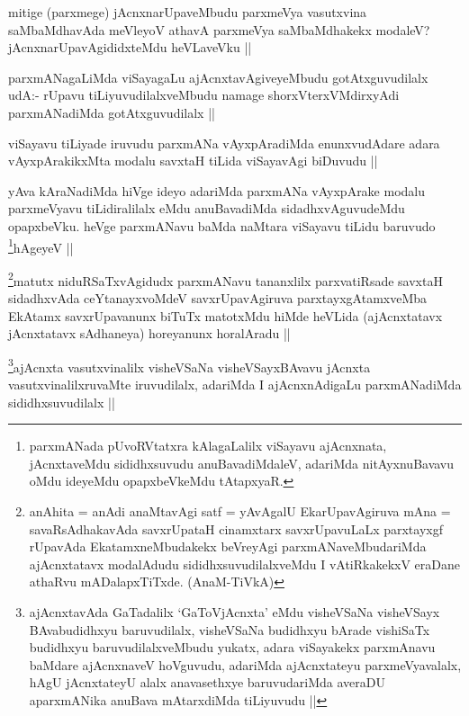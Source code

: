 \begin{artha}
mitige (parxmege) jAcnxnarUpaveMbudu parxmeVya vasutxvina saMbaMdhavAda meVleyoV athavA parxmeVya saMbaMdhakekx modaleV? jAcnxnarUpavAgididxteMdu heVLaveVku ||
\end{artha}

\begin{artha}
parxmANagaLiMda viSayagaLu ajAcnxtavAgiveyeMbudu gotAtxguvudilalx udA:- rUpavu tiLiyuvudilalxveMbudu namage shorxVterxVMdirxyAdi parxmANadiMda gotAtxguvudilalx ||
\end{artha}

\begin{artha}
viSayavu tiLiyade iruvudu parxmANa vAyxpAradiMda enunxvudAdare adara vAyxpArakikxMta modalu savxtaH tiLida viSayavAgi biDuvudu ||
\end{artha}

\begin{artha}
yAva kAraNadiMda hiVge ideyo adariMda parxmANa vAyxpArake modalu parxmeVyavu tiLidiralilalx eMdu anuBavadiMda sidadhxvAguvudeMdu opapxbeVku. heVge parxmANavu baMda naMtara viSayavu tiLidu baruvudo \footnote{parxmANada pUvoRVtatxra kAlagaLalilx viSayavu ajAcnxnata, jAcnxtaveMdu sididhxsuvudu anuBavadiMdaleV, adariMda nitAyxnuBavavu oMdu ideyeMdu opapxbeVkeMdu tAtapxyaR.}hAgeyeV ||
\end{artha}

\begin{artha}
\footnote{anAhita =  anAdi anaMtavAgi satf = yAvAgalU EkarUpavAgiruva mAna =  savaRsAdhakavAda savxrUpataH cinamxtarx savxrUpavuLaLx parxtayxgf rUpavAda EkatamxneMbudakekx beVreyAgi parxmANaveMbudariMda ajAcnxtatavx modalAdudu sididhxsuvudilalxveMdu I vAtiRkakekxV eraDane athaRvu mADalapxTiTxde. (AnaM-TiVkA)}matutx niduRSaTxvAgidudx parxmANavu tananxlilx parxvatiRsade savxtaH sidadhxvAda ceYtanayxvoMdeV savxrUpavAgiruva parxtayxgAtamxveMba EkAtamx savxrUpavanunx biTuTx matotxMdu hiMde heVLida (ajAcnxtatavx jAcnxtatavx sAdhaneya) horeyanunx horalAradu ||
\end{artha}

\begin{artha}
\footnote{ajAcnxtavAda GaTadalilx `GaToVjAcnxta' eMdu visheVSaNa visheVSayx BAvabudidhxyu baruvudilalx, visheVSaNa budidhxyu bArade vishiSaTx budidhxyu baruvudilalxveMbudu yukatx, adara viSayakekx parxmAnavu baMdare ajAcnxnaveV hoVguvudu, adariMda ajAcnxtateyu parxmeVyavalalx, hAgU jAcnxtateyU alalx anavasethxye baruvudariMda averaDU aparxmANika anuBava mAtarxdiMda tiLiyuvudu ||}ajAcnxta vasutxvinalilx visheVSaNa visheVSayxBAvavu jAcnxta vasutxvinalilxruvaMte iruvudilalx, adariMda I ajAcnxnAdigaLu parxmANadiMda sididhxsuvudilalx ||
\end{artha}

